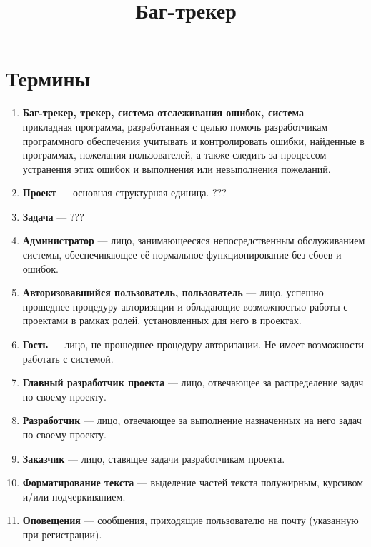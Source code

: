 \documentclass[14pt,a4paper]{extarticle}
\begin{document}
	
	\title {Баг-трекер}
	
	\section {Термины}
	\begin{enumerate}
		\item {\bf Баг-трекер, трекер, система отслеживания ошибок, система} --- прикладная программа, разработанная с целью помочь разработчикам программного обеспечения учитывать и контролировать ошибки, найденные в программах, пожелания пользователей, а также следить за процессом устранения этих ошибок и выполнения или невыполнения пожеланий.
		
		\item {\bf Проект} --- основная структурная единица. ???
		
		\item {\bf Задача} --- ???
		
		\item {\bf Администратор} --- лицо, занимающеесяся непосредственным обслуживанием системы, обеспечивающее её нормальное функционирование без сбоев и ошибок.
		
		\item {\bf Авторизовавшийся пользователь, пользователь} --- лицо, успешно прошеднее процедуру авторизации и обладающие возможностью работы с проектами в рамках ролей, установленных для него в проектах.
		
		\item {\bf Гость} --- лицо, не прошедшее процедуру авторизации. Не имеет возможности работать с системой.
		
		\item {\bf Главный разработчик проекта} --- лицо, отвечающее за распределение задач по своему проекту.
		
		\item {\bf Разработчик} --- лицо, отвечающее за выполнение назначенных на него задач по своему проекту.
		
		\item {\bf Заказчик} --- лицо, ставящее задачи разработчикам проекта.
		
		\item {\bf Форматирование текста} --- выделение частей текста полужирным, курсивом и/или подчеркиванием.
		
		\item {\bf Оповещения} --- сообщения, приходящие пользователю на почту (указанную при регистрации).
	\end{enumerate}
	
\end{document}
